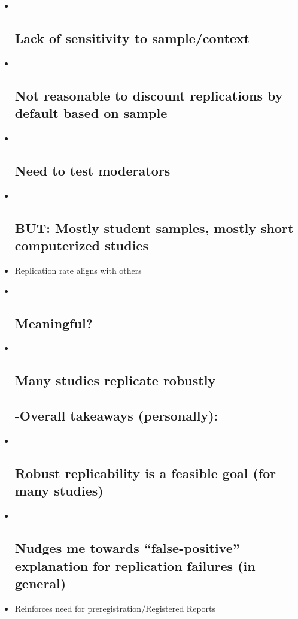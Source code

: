 \documentclass[]{article}
\begin{document}
\begin{itemize}
\item ~
  \subsection{Lack of sensitivity to
  sample/context}\label{lack-of-sensitivity-to-samplecontext}
\item ~
  \subsection{Not reasonable to discount replications by default based
  on
  sample}\label{not-reasonable-to-discount-replications-by-default-based-on-sample}
\item ~
  \subsection{Need to test moderators}\label{need-to-test-moderators}
\item ~
  \subsection{BUT: Mostly student samples, mostly short computerized
  studies}\label{but-mostly-student-samples-mostly-short-computerized-studies}
\item
  Replication rate aligns with others
\item ~
  \subsection{Meaningful?}\label{meaningful}
\item ~
  \subsection{Many studies replicate
  robustly}\label{many-studies-replicate-robustly}

  \subsection{-Overall takeaways
  (personally):}\label{overall-takeaways-personally}
\item ~
  \subsection{Robust replicability is a feasible goal (for many
  studies)}\label{robust-replicability-is-a-feasible-goal-for-many-studies}
\item ~
  \subsection{\texorpdfstring{Nudges me towards ``false-positive''
  explanation for replication failures (in
  general)}{Nudges me towards false-positive explanation for replication failures (in general)}}\label{nudges-me-towards-false-positive-explanation-for-replication-failures-in-general}
\item
  Reinforces need for preregistration/Registered Reports
\end{itemize}
\end{document}
